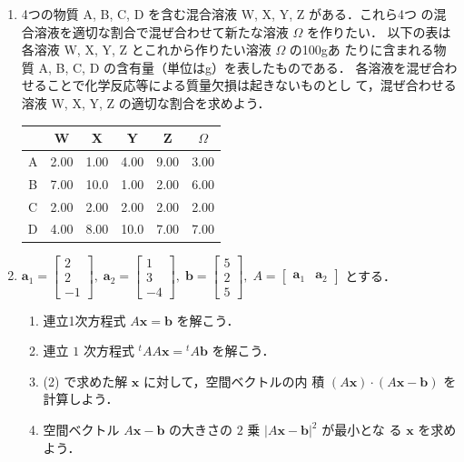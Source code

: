 \documentclass[11pt, uplatex, dvipdfmx]{jsarticle}
\begin{document}
\begin{enumerate}[label=\ref{sec:system}.\arabic*]
\item 4つの物質 A, B, C, D を含む混合溶液 W, X, Y, Z がある．これら4つ
  の混合溶液を適切な割合で混ぜ合わせて新たな溶液 $\Omega$ を作りたい．
  以下の表は各溶液 W, X, Y, Z とこれから作りたい溶液 $\Omega$ の100gあ
  たりに含まれる物質 A, B, C, D の含有量（単位はg）を表したものである．
  各溶液を混ぜ合わせることで化学反応等による質量欠損は起きないものとし
  て，混ぜ合わせる溶液 W, X, Y, Z の適切な割合を求めよう．
\begin{table}[h]
  \centering
  \begin{tabular}{ccccc|c}
    & W & X & Y & Z & $\Omega$\\ \hline
    A & 2.00 & 1.00 & 4.00 & 9.00 & 3.00\\ \hline
    B & 7.00 & 10.0 & 1.00 & 2.00 & 6.00\\ \hline  
    C & 2.00 & 2.00 & 2.00 & 2.00 & 2.00 \\ \hline
    D & 4.00 & 8.00 & 10.0 & 7.00 & 7.00\\ 
  \end{tabular}
\end{table}

  
\item $\bm{a}_1 = \left[
    \begin{array}{r}
      2\\
      2\\
      -1
    \end{array}
  \right], \; \bm{a}_2=\left[
    \begin{array}{r}
      1\\
      3\\
      -4
    \end{array}
  \right], \; \bm{b} = \left[
    \begin{array}{r}
      5\\
      2\\
      5
    \end{array}
  \right], \; A=\left[
    \begin{array}{cc}
      \bm{a}_1 & \bm{a}_2
    \end{array}
  \right]$ とする．
      
  \vspace{1zh}

  
  \begin{enumerate}[label=(\arabic*)]
    \setlength{\itemsep}{1ex}
    
  \item 連立1次方程式 $A\bm{x} = \bm{b}$ を解こう．

  \item 連立 $1$ 次方程式 ${}^{t}A A\bm{x} = {}^{t}A \bm{b}$ を解こう．

  \item (2) で求めた解 $\bm{x}$ に対して，空間ベクトルの内
    積 $(A\bm{x}) \cdot (A\bm{x} -\bm{b})$ を計算しよう．

  \item 空間ベクトル $A\bm{x}-\bm{b}$ の大きさの $2$ 乗 $|A\bm{x} - \bm{b}|^2$ が最小とな
    る $\bm{x}$ を求めよう．
  \end{enumerate}
    
\end{enumerate}
\end{document}
